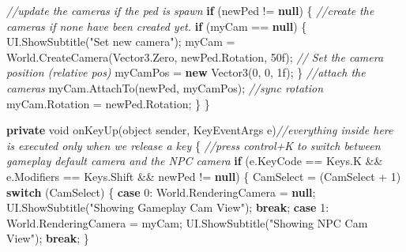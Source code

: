 \documentclass[
  openany]{book}
\newenvironment{Shaded}{\begin{snugshade}}{\end{snugshade}}
\newcommand{\CommentTok}[1]{\textcolor[rgb]{0.56,0.35,0.01}{\textit{#1}}}
\newcommand{\DataTypeTok}[1]{\textcolor[rgb]{0.13,0.29,0.53}{#1}}
\newcommand{\DecValTok}[1]{\textcolor[rgb]{0.00,0.00,0.81}{#1}}
\newcommand{\FunctionTok}[1]{\textcolor[rgb]{0.00,0.00,0.00}{#1}}
\newcommand{\KeywordTok}[1]{\textcolor[rgb]{0.13,0.29,0.53}{\textbf{#1}}}
\newcommand{\NormalTok}[1]{#1}
\newcommand{\StringTok}[1]{\textcolor[rgb]{0.31,0.60,0.02}{#1}}
\begin{document}
\begin{Shaded}
\begin{Highlighting}[]
            \CommentTok{//update the cameras if the ped is spawn}
            \KeywordTok{if}\NormalTok{ (newPed != }\KeywordTok{null}\NormalTok{)}
\NormalTok{            \{           }
                \CommentTok{//create the cameras if none have been created yet.}
                \KeywordTok{if}\NormalTok{ (myCam == }\KeywordTok{null}\NormalTok{)            }
\NormalTok{                \{}
\NormalTok{                    UI.}\FunctionTok{ShowSubtitle}\NormalTok{(}\StringTok{"Set new camera"}\NormalTok{);}
\NormalTok{                    myCam = World.}\FunctionTok{CreateCamera}\NormalTok{(Vector3.}\FunctionTok{Zero}\NormalTok{, newPed.}\FunctionTok{Rotation}\NormalTok{, 50f);}
                    \CommentTok{// Set the camera position (relative pos)          }
\NormalTok{                    myCamPos = }\KeywordTok{new} \FunctionTok{Vector3}\NormalTok{(}\DecValTok{0}\NormalTok{, }\DecValTok{0}\NormalTok{, 1f);}
\NormalTok{                \}}
                \CommentTok{//attach the cameras}
\NormalTok{                myCam.}\FunctionTok{AttachTo}\NormalTok{(newPed, myCamPos);}
                \CommentTok{//sync rotation}
\NormalTok{                myCam.}\FunctionTok{Rotation}\NormalTok{ = newPed.}\FunctionTok{Rotation}\NormalTok{;}
\NormalTok{            \}}
\NormalTok{        \}}
        

        \KeywordTok{private} \DataTypeTok{void} \FunctionTok{onKeyUp}\NormalTok{(}\DataTypeTok{object}\NormalTok{ sender, KeyEventArgs e)}\CommentTok{//everything inside here is executed only when we release a key}
\NormalTok{        \{}
            \CommentTok{//press control+K to switch between gameplay default camera and the NPC camera}
            \KeywordTok{if}\NormalTok{ (e.}\FunctionTok{KeyCode}\NormalTok{ == Keys.}\FunctionTok{K}\NormalTok{ && e.}\FunctionTok{Modifiers}\NormalTok{ == Keys.}\FunctionTok{Shift}\NormalTok{ && newPed != }\KeywordTok{null}\NormalTok{)}
\NormalTok{            \{}
\NormalTok{                CamSelect = (CamSelect + }\DecValTok{1}\NormalTok{) % }\DecValTok{2}\NormalTok{;}
                \KeywordTok{switch}\NormalTok{ (CamSelect)}
\NormalTok{                \{}
                    \KeywordTok{case} \DecValTok{0}\NormalTok{: World.}\FunctionTok{RenderingCamera}\NormalTok{ = }\KeywordTok{null}\NormalTok{; }
\NormalTok{                        UI.}\FunctionTok{ShowSubtitle}\NormalTok{(}\StringTok{"Showing Gameplay Cam View"}\NormalTok{); }
                        \KeywordTok{break}\NormalTok{;}
                    \KeywordTok{case} \DecValTok{1}\NormalTok{: World.}\FunctionTok{RenderingCamera}\NormalTok{ = myCam; }
\NormalTok{                        UI.}\FunctionTok{ShowSubtitle}\NormalTok{(}\StringTok{"Showing NPC Cam View"}\NormalTok{); }
                        \KeywordTok{break}\NormalTok{;}
\NormalTok{                \}}

}
\end{Highlighting}
\end{Shaded}
\end{document}
